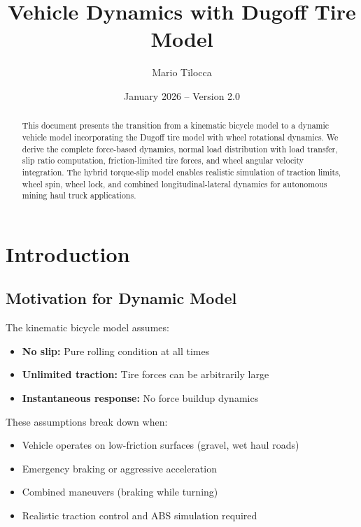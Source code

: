 \documentclass[11pt,a4paper]{article}
\title{Vehicle Dynamics with Dugoff Tire Model}
\author{Mario Tilocca}
\date{January 2026 -- Version 2.0}
\begin{document}
\maketitle


\begin{abstract}
This document presents the transition from a kinematic bicycle model to a dynamic vehicle model incorporating the Dugoff tire model with wheel rotational dynamics. We derive the complete force-based dynamics, normal load distribution with load transfer, slip ratio computation, friction-limited tire forces, and wheel angular velocity integration. The hybrid torque-slip model enables realistic simulation of traction limits, wheel spin, wheel lock, and combined longitudinal-lateral dynamics for autonomous mining haul truck applications.
\end{abstract}


\tableofcontents
\clearpage


\section{Introduction}

\subsection{Motivation for Dynamic Model}

The kinematic bicycle model assumes:
\begin{itemize}
    \item \textbf{No slip:} Pure rolling condition at all times
    \item \textbf{Unlimited traction:} Tire forces can be arbitrarily large
    \item \textbf{Instantaneous response:} No force buildup dynamics
\end{itemize}

These assumptions break down when:
\begin{itemize}
    \item Vehicle operates on low-friction surfaces (gravel, wet haul roads)
    \item Emergency braking or aggressive acceleration
    \item Combined maneuvers (braking while turning)
    \item Realistic traction control and ABS simulation required
\end{itemize}
\end{document}
